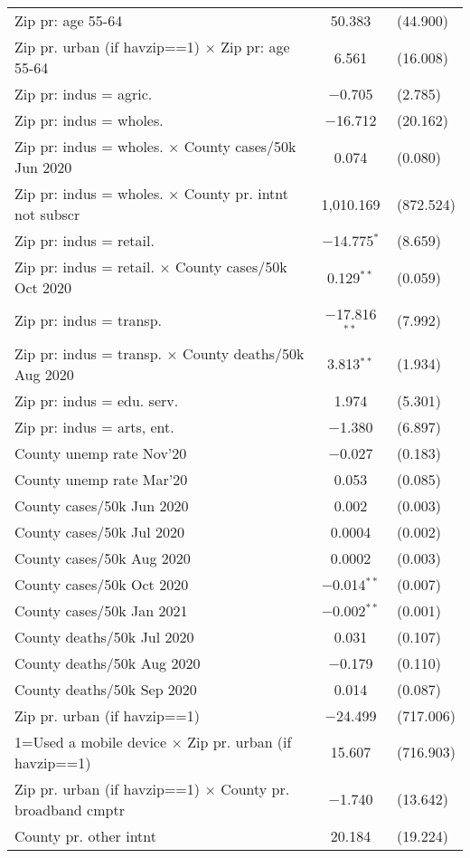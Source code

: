\begin{table}[!htbp]
\begin{tabular}{@{\extracolsep{5pt}}lc}
  Zip pr: age 55-64 & 50.383 & (44.900) \\ 
  Zip pr. urban (if havzip==1) $\times$ Zip pr: age 55-64 & 6.561 & (16.008) \\ 
  Zip pr: indus = agric. & $-$0.705 & (2.785) \\ 
  Zip pr: indus = wholes. & $-$16.712 & (20.162) \\ 
  Zip pr: indus = wholes. $\times$ County cases/50k Jun 2020 & 0.074 & (0.080) \\ 
  Zip pr: indus = wholes. $\times$ County pr. intnt not subscr & 1,010.169 & (872.524) \\ 
  Zip pr: indus = retail. & $-$14.775$^{*}$ & (8.659) \\ 
  Zip pr: indus = retail. $\times$ County cases/50k Oct 2020 & 0.129$^{**}$ & (0.059) \\ 
  Zip pr: indus = transp. & $-$17.816$^{**}$ & (7.992) \\ 
  Zip pr: indus = transp. $\times$ County deaths/50k Aug 2020 & 3.813$^{**}$ & (1.934) \\ 
  Zip pr: indus = edu. serv. & 1.974 & (5.301) \\ 
  Zip pr: indus = arts, ent. & $-$1.380 & (6.897) \\ 
  County unemp rate Nov'20 & $-$0.027 & (0.183) \\ 
  County unemp rate Mar'20 & 0.053 & (0.085) \\ 
  County cases/50k Jun 2020 & 0.002 & (0.003) \\ 
  County cases/50k Jul 2020 & 0.0004 & (0.002) \\ 
  County cases/50k Aug 2020 & 0.0002 & (0.003) \\ 
  County cases/50k Oct 2020 & $-$0.014$^{**}$ & (0.007) \\ 
  County cases/50k Jan 2021 & $-$0.002$^{**}$ & (0.001) \\ 
  County deaths/50k Jul 2020 & 0.031 & (0.107) \\ 
  County deaths/50k Aug 2020 & $-$0.179 & (0.110) \\ 
  County deaths/50k Sep 2020 & 0.014 & (0.087) \\ 
  Zip pr. urban (if havzip==1) & $-$24.499 & (717.006) \\ 
  1=Used a mobile device $\times$ Zip pr. urban (if havzip==1) & 15.607 & (716.903) \\ 
  Zip pr. urban (if havzip==1) $\times$ County pr. broadband cmptr & $-$1.740 & (13.642) \\ 
  County pr. other intnt & 20.184 & (19.224) \\ 

\end{tabular}
\end{table}
